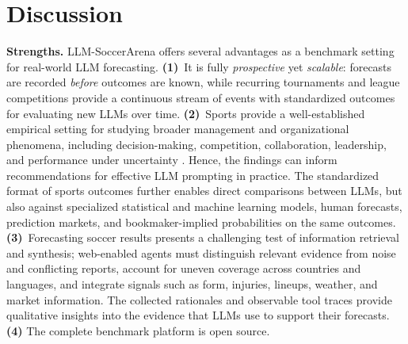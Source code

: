 \documentclass[sigconf,nonacm]{acmart}
\newcommand{\arena}{\mbox{LLM-SoccerArena}\xspace}
\begin{document}
\section{Discussion}
\label{sec:discussion}

\textbf{Strengths.}
\arena offers several advantages as a benchmark setting for real-world LLM forecasting. \textbf{(1)}~It is fully \emph{prospective} yet \emph{scalable}: forecasts are recorded \emph{before} outcomes are known, while recurring tournaments and league competitions provide a continuous stream of events with standardized outcomes for evaluating new LLMs over time. \textbf{(2)}~Sports provide a well-established empirical setting for studying broader management and organizational phenomena, including decision-making, competition, collaboration, leadership, and performance under uncertainty \cite{wolfe2005, day2012}. Hence, the findings can inform recommendations for effective LLM prompting in practice. The standardized format of sports outcomes further enables direct comparisons between LLMs, but also against specialized statistical and machine learning models, human forecasts, prediction markets, and bookmaker-implied probabilities on the same outcomes. \textbf{(3)}~Forecasting soccer results presents a challenging test of information retrieval and synthesis; web-enabled agents must distinguish relevant evidence from noise and conflicting reports, account for uneven coverage across countries and languages, and integrate signals such as form, injuries, lineups, weather, and market information. The collected rationales and observable tool traces provide qualitative insights into the evidence that LLMs use to support their forecasts. \textbf{(4)} The complete benchmark platform is open source.
\end{document}
